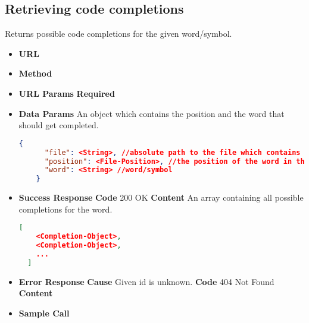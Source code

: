 \subsection{Retrieving code completions}
\notimlpemented\newline
Returns possible code completions for the given word/symbol.

\begin{itemize}
\item \textbf{URL} 
\item \textbf{Method} 

\item \textbf{URL Params}
  \newline\textbf{Required} 

\item \textbf{Data Params} An object which contains the position and the word that should get completed.
  \begin{lstlisting}[basicstyle=\small,language=json]
    {
      "file": <String>, //absolute path to the file which contains the word/symbol
      "position": <File-Position>, //the position of the word in the file
      "word": <String> //word/symbol
    }
  \end{lstlisting}

\item \textbf{Success Response}
  \newline\textbf{Code} 200 OK
  \newline\textbf{Content} An array containing all possible completions for the word.
  \begin{lstlisting}[basicstyle=\small,language=json]
  [
    <Completion-Object>,
    <Completion-Object>,
    ...
  ]
  \end{lstlisting}

\item \textbf{Error Response}
  \newline\textbf{Cause} Given id is unknown.
  \newline\textbf{Code} 404 Not Found
  \newline\textbf{Content} 

\item \textbf{Sample Call}
\end{itemize}
